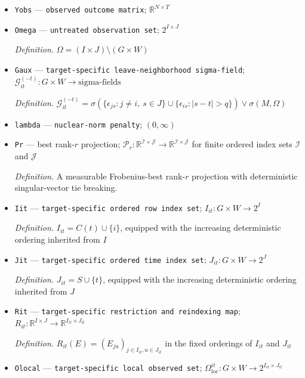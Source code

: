 \documentclass{article}
\begin{document}
\begin{itemize}
  \item \texttt{Yobs} --- \texttt{observed outcome matrix}; \(\mathbb R^{N\times T}\)
  \item \texttt{Omega} --- \texttt{untreated observation set}; \(2^{I\times J}\)
  \par\smallskip\noindent\emph{Definition.} \(\Omega=(I\times J)\setminus(G\times W)\)
  \item \texttt{Gaux} --- \texttt{target-\allowbreak{}specific leave-\allowbreak{}neighborhood sigma-\allowbreak{}field}; \(\mathcal G^{(-t)}_{it}:G\times W\to\text{sigma-fields}\)
  \par\smallskip\noindent\emph{Definition.} \(\mathcal G_{it}^{(-t)}=\sigma(\{\epsilon_{js}:j\ne i,\ s\in J\}\cup\{\epsilon_{is}:|s-t|>q\})\vee\sigma(M,\Omega)\)
  \item \texttt{lambda} --- \texttt{nuclear-\allowbreak{}norm penalty}; \((0,\infty)\)
  \item \texttt{Pr} --- best rank-\(r\) projection; \(\mathcal P_r:\mathbb R^{\mathcal I\times\mathcal J}\to\mathbb R^{\mathcal I\times\mathcal J}\) for finite ordered index sets \(\mathcal I\) and \(\mathcal J\)
  \par\smallskip\noindent\emph{Definition.} A measurable Frobenius-best rank-\(r\) projection with deterministic singular-vector tie breaking.
  \item \texttt{Iit} --- \texttt{target-\allowbreak{}specific ordered row index set}; \(I_{it}:G\times W\to 2^I\)
  \par\smallskip\noindent\emph{Definition.} \(I_{it}=C(t)\cup\{i\}\), equipped with the increasing deterministic ordering inherited from \(I\)
  \item \texttt{Jit} --- \texttt{target-\allowbreak{}specific ordered time index set}; \(J_{it}:G\times W\to 2^J\)
  \par\smallskip\noindent\emph{Definition.} \(J_{it}=S\cup\{t\}\), equipped with the increasing deterministic ordering inherited from \(J\)
  \item \texttt{Rit} --- \texttt{target-\allowbreak{}specific restriction and reindexing map}; \(R_{it}:\mathbb R^{I\times J}\to\mathbb R^{I_{it}\times J_{it}}\)
  \par\smallskip\noindent\emph{Definition.} \(R_{it}(E)=(E_{ju})_{j\in I_{it},u\in J_{it}}\) in the fixed orderings of \(I_{it}\) and \(J_{it}\)
  \item \texttt{Olocal} --- \texttt{target-\allowbreak{}specific local observed set}; \(\Omega_{\mathrm{loc}}^{it}:G\times W\to 2^{I_{it}\times J_{it}}\)

\end{itemize}
\end{document}
